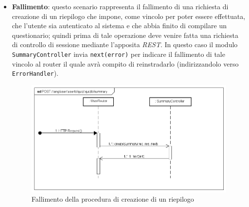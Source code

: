 \begin{itemize}
\item \textbf{Fallimento}: questo scenario rappresenta il fallimento di una richiesta di creazione di un riepilogo che impone, come vincolo per poter essere effettuata, che l'utente sia autenticato al sistema e che abbia finito di compilare un questionario; quindi prima di tale operazione deve venire fatta una richiesta di controllo di sessione mediante l'apposita \textit{REST}. In questo caso il modulo \texttt{SummaryController} invia \texttt{next(error)} per indicare il fallimento di tale vincolo al router il quale avrà compito di reinstradarlo (indirizzandolo verso \texttt{ErrorHandler}).
\label{Fallimento della procedura di creazione di un riepilogo}
\begin{figure}[ht]
	\centering
	\includegraphics[scale=0.40]{UML/DiagrammiDiSequenza/Back-end/POST__lang_user_userId_quiz_quizId_summary_failure.png}
	\caption{Fallimento della procedura di creazione di un riepilogo}
\end{figure}
\FloatBarrier
\end{itemize}

